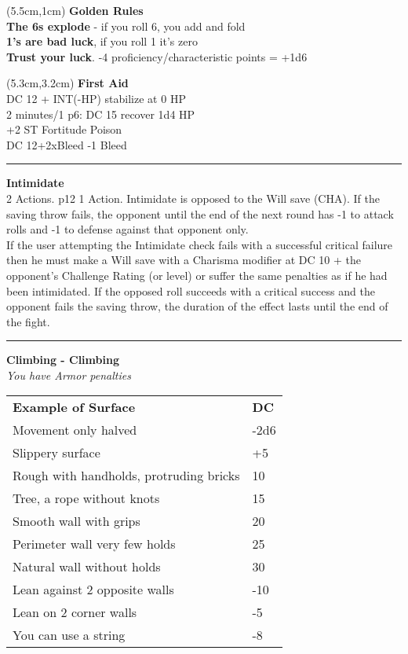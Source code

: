 \documentclass[a4paper,12 pt,openany]{book}
\newcommand{\linex}{\rule{\textwidth}{0.4pt}}
\begin{document}
\begin{textblock*}{14.5cm}(5.5cm,1cm) %
\textbf{Golden Rules}\\

{\textbf{The 6s explode}} - if you roll 6, you add and fold\\
\textbf{1's are bad luck}, if you roll 1 it's zero\\
\textbf{Trust your luck}. -4 proficiency/characteristic points = +1d6\\
\end{textblock*}


\begin{textblock*}{7.4cm}(5.3cm,3.2cm) %
\textbf{First Aid}\\
DC 12 + INT(-HP) stabilize at 0 HP\\
2 minutes/1 p6: DC 15 recover 1d4 HP\\
+2 ST Fortitude Poison\\
DC 12+2xBleed -1 Bleed

\linex

\textbf{Intimidate}\\
2 Actions. p12 1 Action. Intimidate is opposed to the Will save (CHA). If the saving throw fails, the opponent until the end of the next round has -1 to attack rolls and -1 to defense against that opponent only.\\
If the user attempting the Intimidate check fails with a successful critical failure then he must make a Will save with a Charisma modifier at DC 10 + the opponent's Challenge Rating (or level) or suffer the same penalties as if he had been intimidated.
If the opposed roll succeeds with a critical success and the opponent fails the saving throw, the duration of the effect lasts until the end of the fight.

\linex

\textbf{Climbing - Climbing}\\
\textit{You have Armor penalties}

\begin{tabular}{ll}
\textbf{Example of Surface} & \textbf{DC}\\
Movement only halved & -2d6\\
Slippery surface&+5\\
Rough with handholds, protruding bricks&10\\
Tree, a rope without knots&15\\
Smooth wall with grips &20\\
Perimeter wall very few holds&25\\
Natural wall without holds&30\\
Lean against 2 opposite walls&-10\\
Lean on 2 corner walls&-5\\
You can use a string&-8\\
\end{tabular}


\end{textblock*}
\end{document}
